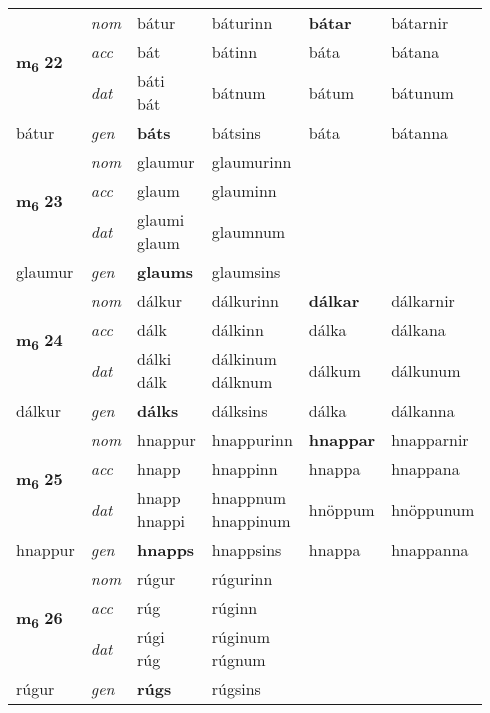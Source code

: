 \begin{longtable}[l]{X>{\footnotesize\itshape}XXXXX}
\multirow{3}{*}{{{\textbf{m{\textsubscript{6}}} \Large{\textbf{22}}}}} & nom & bátur & báturinn & \textbf{bátar} & bátarnir \\*
 & acc & bát & bátinn & báta & bátana \\*
 & dat & \specialcell{báti\\ bát} & bátnum & bátum & bátunum \\*
 {\footnotesize{bátur}} & gen & \textbf{báts} & bátsins & báta & bátanna \\
\cmidrule{1-6}

\multirow{3}{*}{{{\textbf{m{\textsubscript{6}}} \Large{\textbf{23}}}}} & nom & glaumur & glaumurinn & \textbf{} &  \\*
 & acc & glaum & glauminn &  &  \\*
 & dat & \specialcell{glaumi\\ glaum} & glaumnum &  &  \\*
 {\footnotesize{glaumur}} & gen & \textbf{glaums} & glaumsins &  &  \\
\cmidrule{1-6}

\multirow{3}{*}{{{\textbf{m{\textsubscript{6}}} \Large{\textbf{24}}}}} & nom & dálkur & dálkurinn & \textbf{dálkar} & dálkarnir \\*
 & acc & dálk & dálkinn & dálka & dálkana \\*
 & dat & \specialcell{dálki\\ dálk} & \specialcell{dálkinum\\ dálknum} & dálkum & dálkunum \\*
 {\footnotesize{dálkur}} & gen & \textbf{dálks} & dálksins & dálka & dálkanna \\
\cmidrule{1-6}

\multirow{3}{*}{{{\textbf{m{\textsubscript{6}}} \Large{\textbf{25}}}}} & nom & hnappur & hnappurinn & \textbf{hnappar} & hnapparnir \\*
 & acc & hnapp & hnappinn & hnappa & hnappana \\*
 & dat & \specialcell{hnapp\\ hnappi} & \specialcell{hnappnum\\ hnappinum} & hnöppum & hnöppunum \\*
 {\footnotesize{hnappur}} & gen & \textbf{hnapps} & hnappsins & hnappa & hnappanna \\
\cmidrule{1-6}

\multirow{3}{*}{{{\textbf{m{\textsubscript{6}}} \Large{\textbf{26}}}}} & nom & rúgur & rúgurinn & \textbf{} &  \\*
 & acc & rúg & rúginn &  &  \\*
 & dat & \specialcell{rúgi\\ rúg} & \specialcell{rúginum\\ rúgnum} &  &  \\*
 {\footnotesize{rúgur}} & gen & \textbf{rúgs} & rúgsins &  &  \\
\cmidrule{1-6}


\end{longtable}
